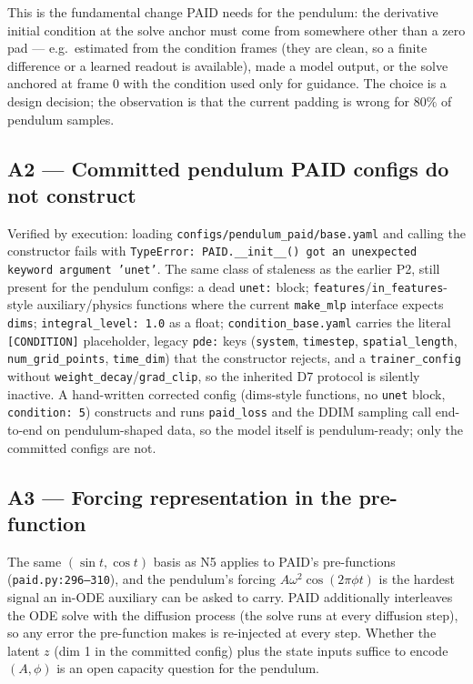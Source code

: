 \documentclass[11pt,a4paper]{article}
\newcommand{\code}[1]{\texttt{#1}}
\begin{document}
This is the fundamental change PAID needs for the pendulum: the derivative
initial condition at the solve anchor must come from somewhere other than a
zero pad --- e.g.\ estimated from the condition frames (they are clean, so a
finite difference or a learned readout is available), made a model output, or
the solve anchored at frame 0 with the condition used only for guidance.
The choice is a design decision; the observation is that the current padding
is wrong for $80\%$ of pendulum samples.

\subsection*{A2 --- Committed pendulum PAID configs do not construct}

Verified by execution: loading \code{configs/pendulum\_paid/base.yaml} and
calling the constructor fails with \code{TypeError: PAID.\_\_init\_\_() got an
unexpected keyword argument 'unet'}. The same class of staleness as the
earlier P2, still present for the pendulum configs: a dead \code{unet:} block;
\code{features}/\code{in\_features}-style auxiliary/physics functions where
the current \code{make\_mlp} interface expects \code{dims};
\code{integral\_level: 1.0} as a float; \code{condition\_base.yaml} carries
the literal \code{[CONDITION]} placeholder, legacy \code{pde:} keys
(\code{system}, \code{timestep}, \code{spatial\_length},
\code{num\_grid\_points}, \code{time\_dim}) that the constructor rejects, and
a \code{trainer\_config} without \code{weight\_decay}/\code{grad\_clip}, so
the inherited D7 protocol is silently inactive. A hand-written corrected
config (dims-style functions, no \code{unet} block, \code{condition: 5})
constructs and runs \code{paid\_loss} and the DDIM sampling call end-to-end
on pendulum-shaped data, so the model itself is pendulum-ready; only the
committed configs are not.

\subsection*{A3 --- Forcing representation in the pre-function}

The same $(\sin t, \cos t)$ basis as N5 applies to PAID's pre-functions
(\code{paid.py:296--310}), and the pendulum's forcing
$A\omega^2\cos(2\pi\phi t)$ is the hardest signal an in-ODE auxiliary can be
asked to carry. PAID additionally interleaves the ODE solve with the diffusion
process (the solve runs at every diffusion step), so any error the pre-function
makes is re-injected at every step. Whether the latent $z$ (dim 1 in the
committed config) plus the state inputs suffice to encode $(A, \phi)$ is an
open capacity question for the pendulum.
\end{document}
